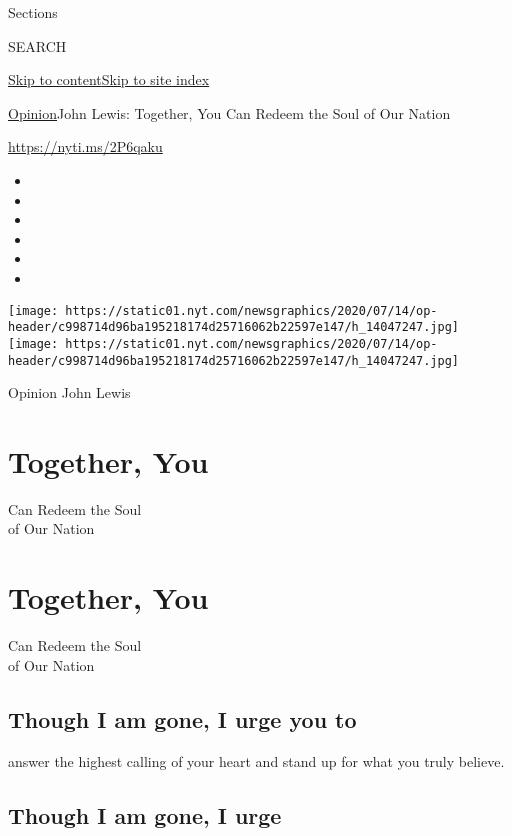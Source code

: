 Sections

SEARCH

\protect\hyperlink{site-content}{Skip to
content}\protect\hyperlink{site-index}{Skip to site index}

\href{/section/opinion}{Opinion}\textbar{}John Lewis: Together, You Can
Redeem the Soul of Our Nation

\url{https://nyti.ms/2P6qaku}

\begin{itemize}
\item
\item
\item
\item
\item
\item
\end{itemize}

\texttt{[image: https://static01.nyt.com/newsgraphics/2020/07/14/op-header/c998714d96ba195218174d25716062b22597e147/h\_14047247.jpg]}
\texttt{[image: https://static01.nyt.com/newsgraphics/2020/07/14/op-header/c998714d96ba195218174d25716062b22597e147/h\_14047247.jpg]}

 Opinion John Lewis

\hypertarget{together-you}{%
\section{Together, You}\label{together-you}}

Can Redeem the Soul\\
of Our Nation

\hypertarget{together-you-1}{%
\section{Together, You}\label{together-you-1}}

Can Redeem the Soul\\
of Our Nation

\hypertarget{though-i-am-gone-i-urge-you-to}{%
\subsection{Though I am gone, I urge you
to}\label{though-i-am-gone-i-urge-you-to}}

answer the highest calling of your heart and stand up for what you truly
believe.

\hypertarget{though-i-am-gone-i-urge}{%
\subsection{Though I am gone, I urge}\label{though-i-am-gone-i-urge}}

